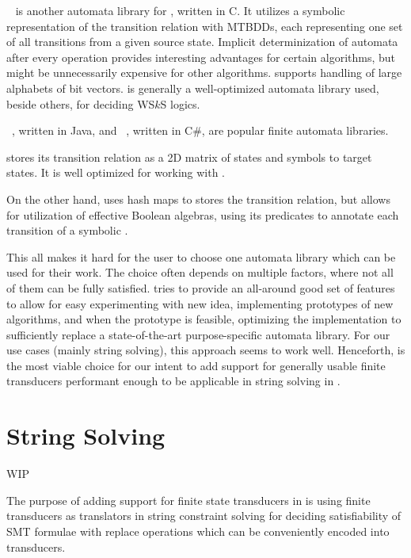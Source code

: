 \mona~\cite{mona} is another automata library for \dfas, written in C.
It utilizes a symbolic representation of the transition relation with MTBDDs, each representing one set of all transitions from a given source state.
Implicit determinization of automata after every operation provides interesting advantages for certain algorithms, but might be unnecessarily expensive for other algorithms.
\mona supports handling of large alphabets of bit vectors.
\mona is generally a well-optimized automata library used, beside others, for deciding WS$k$S logics.

\automatajar~\cite{automatajar}, written in Java, and \automatanet~\cite{automatanet}, written in C\#, are popular finite automata libraries.

\automatajar stores its transition relation as a 2D matrix of states and symbols to target states.
It is well optimized for working with \dfas.

On the other hand, \automatanet uses hash maps to stores the transition relation, but allows for utilization of effective Boolean algebras, using its predicates to annotate each transition of a symbolic \nfa.

This all makes it hard for the user to choose one automata library which can be used for their work.
The choice often depends on multiple factors, where not all of them can be fully satisfied.
\mata tries to provide an all-around good set of features to allow for easy experimenting with new idea, implementing prototypes of new algorithms, and when the prototype is feasible, optimizing the implementation to sufficiently replace a state-of-the-art purpose-specific automata library.
For our use cases (mainly string solving), this approach seems to work well.
Henceforth, \mata is the most viable choice for our intent to add support for generally usable finite transducers performant enough to be applicable in string solving in \noodler.

\chapter{String Solving}
\label{chap:string_solving}

WIP

The purpose of adding support for finite state transducers in \mata is using finite transducers as translators in string constraint solving for deciding satisfiability of SMT formulae with replace operations which can be conveniently encoded into transducers.



